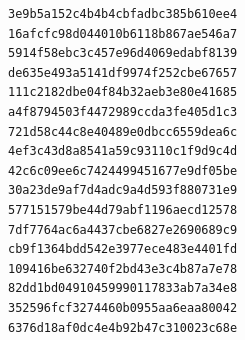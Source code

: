 \documentclass[12pt,a4paper]{article}
\begin{document}
\begin{lstlisting}
3e9b5a152c4b4b4cbfadbc385b610ee4
16afcfc98d044010b6118b867ae546a7
5914f58ebc3c457e96d4069edabf8139
de635e493a5141df9974f252cbe67657
111c2182dbe04f84b32aeb3e80e41685
a4f8794503f4472989ccda3fe405d1c3
721d58c44c8e40489e0dbcc6559dea6c
4ef3c43d8a8541a59c93110c1f9d9c4d
42c6c09ee6c7424499451677e9df05be
30a23de9af7d4adc9a4d593f880731e9
577151579be44d79abf1196aecd12578
7df7764ac6a4437cbe6827e2690689c9
cb9f1364bdd542e3977ece483e4401fd
109416be632740f2bd43e3c4b87a7e78
82dd1bd04910459990117833ab7a34e8
352596fcf3274460b0955aa6eaa80042
6376d18af0dc4e4b92b47c310023c68e
\end{lstlisting}
\end{document}

